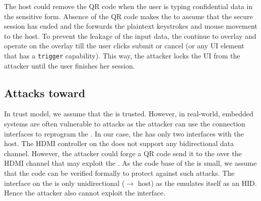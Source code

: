  The host could remove the QR code when the user is typing confidential data in the sensitive form. Absence of the QR code makes the \device to assume that the secure session has ended and the \device forwards the plaintext keystrokes and mouse movement to the host. To prevent the leakage of the input data, the \device continue to overlay and operate on the overlay till the user clicks submit or cancel (or any UI element that has a \texttt{trigger}  capability). This way, the attacker locks the UI from the attacker until the user finishes her session.

\subsection{Attacks toward \device} 

In \name trust model, we assume that the \device is trusted. However, in real-world, embedded systems are often vulnerable to attacks as the attacker can use the connection interfaces to reprogram the \device. In our case, the \device has only two interfaces with the host. The HDMI controller on the \device does not support any bidirectional data channel. However, the attacker could forge a QR code send it to the \device over the HDMI channel that may exploit the \device. As the code base of the \device is small, we assume that the code can be verified formally to protect against such attacks. The \usb interface on the \device is only unidirectional (\device $\rightarrow$ host) as the \device emulates itself as an HID. Hence the attacker also cannot exploit the \usb interface.  
